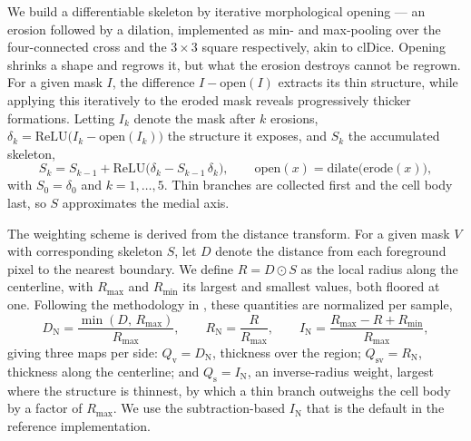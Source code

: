 \documentclass[11pt,a4paper]{article}
\begin{document}
We build a differentiable skeleton by iterative morphological opening --- an
erosion followed by a dilation, implemented as min- and max-pooling over the
four-connected cross and the $3\times3$ square respectively, akin to clDice.
Opening shrinks a shape and regrows it, but what the erosion destroys cannot
be regrown. For a given mask $I$, the difference $I - \mathrm{open}(I)$
extracts its thin structure, while applying this iteratively to the eroded
mask reveals progressively thicker formations. Letting $I_k$ denote the mask
after $k$ erosions,
$\delta_k = \mathrm{ReLU}\big(I_k - \mathrm{open}(I_k)\big)$ the structure
it exposes, and $S_k$ the accumulated skeleton,
\begin{equation}
S_k = S_{k-1} + \mathrm{ReLU}\big(\delta_k - S_{k-1}\,\delta_k\big),
\qquad
\mathrm{open}(x) = \mathrm{dilate}\big(\mathrm{erode}(x)\big),
\label{eq:skel}
\end{equation}
with $S_0 = \delta_0$ and $k = 1,\dots,5$. Thin branches are collected first
and the cell body last, so $S$ approximates the medial axis.

The weighting scheme is derived from the distance transform. For a given
mask $V$ with corresponding skeleton $S$, let $D$ denote the distance from
each foreground pixel to the nearest boundary. We define $R = D \odot S$ as
the local radius along the centerline, with $R_{\max}$ and $R_{\min}$ its
largest and smallest values, both floored at one. Following the methodology
in \cite{shi2024cbdice}, these quantities are normalized per sample,
\begin{equation}
D_{\mathrm{N}} = \frac{\min(D,\,R_{\max})}{R_{\max}},
\qquad
R_{\mathrm{N}} = \frac{R}{R_{\max}},
\qquad
I_{\mathrm{N}} = \frac{R_{\max} - R + R_{\min}}{R_{\max}},
\label{eq:edtweight}
\end{equation}
giving three maps per side: $Q_{\mathrm{v}} = D_{\mathrm{N}}$, thickness
over the region; $Q_{\mathrm{sv}} = R_{\mathrm{N}}$, thickness along the
centerline; and $Q_{\mathrm{s}} = I_{\mathrm{N}}$, an inverse-radius weight,
largest where the structure is thinnest, by which a thin branch outweighs
the cell body by a factor of $R_{\max}$. We use the subtraction-based
$I_{\mathrm{N}}$ that is the default in the reference implementation.
\end{document}
